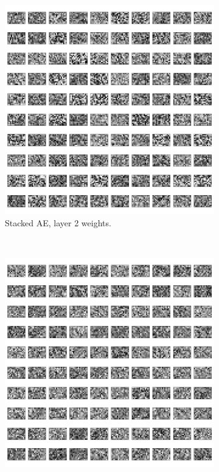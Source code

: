 \documentclass{article}
\begin{document}
\begin{figure}[!ht]
  \centering
  \begin{subfigure}[t]{0.47\textwidth}
    \centering
    \includegraphics[width=\textwidth]{../plots/3_2_1/sae_2l.png}
    \caption{Stacked AE, layer 2 weights.}
    \label{fig:w50ae}
  \end{subfigure}
  ~
  \addtocounter{subfigure}{1}
  \begin{subfigure}[t]{0.47\textwidth}
    \centering
    \includegraphics[width=\textwidth]{../plots/3_2_1/dbn_2l.png}

\end{subfigure}
\end{figure}
\end{document}
